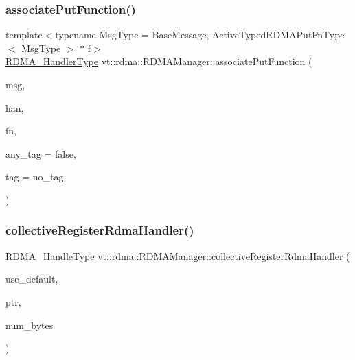 \subsubsection{\texorpdfstring{associate\+Put\+Function()}{associatePutFunction()}}
{\footnotesize\ttfamily template$<$typename Msg\+Type  = Base\+Message, Active\+Typed\+R\+D\+M\+A\+Put\+Fn\+Type$<$ Msg\+Type $>$ $\ast$ f$>$ \\
\hyperlink{namespacevt_a9530efb893c0f3846e8ac5f0507e0f49}{R\+D\+M\+A\+\_\+\+Handler\+Type} vt\+::rdma\+::\+R\+D\+M\+A\+Manager\+::associate\+Put\+Function (\begin{DoxyParamCaption}\item[{Msg\+Type $\ast$}]{msg,  }\item[{\hyperlink{namespacevt_a10442579ec4e7ebef223818e64bcf908}{R\+D\+M\+A\+\_\+\+Handle\+Type} const \&}]{han,  }\item[{\hyperlink{structvt_1_1rdma_1_1_r_d_m_a_manager_ad9746ec3367968e16945ef88c1ac45ce}{R\+D\+M\+A\+\_\+\+Put\+Typed\+Function\+Type}$<$ Msg\+Type $>$ const \&}]{fn,  }\item[{bool const \&}]{any\+\_\+tag = {\ttfamily false},  }\item[{\hyperlink{namespacevt_a84ab281dae04a52a4b243d6bf62d0e52}{Tag\+Type} const \&}]{tag = {\ttfamily no\+\_\+tag} }\end{DoxyParamCaption})\hspace{0.3cm}{\ttfamily [inline]}}

\mbox{\label{structvt_1_1rdma_1_1_r_d_m_a_manager_a526b7c441125a9d5ed9528736be97819}} 
\subsubsection{\texorpdfstring{collective\+Register\+Rdma\+Handler()}{collectiveRegisterRdmaHandler()}}
{\footnotesize\ttfamily \hyperlink{namespacevt_a10442579ec4e7ebef223818e64bcf908}{R\+D\+M\+A\+\_\+\+Handle\+Type} vt\+::rdma\+::\+R\+D\+M\+A\+Manager\+::collective\+Register\+Rdma\+Handler (\begin{DoxyParamCaption}\item[{bool const \&}]{use\+\_\+default,  }\item[{\hyperlink{namespacevt_a9e2c953286c7616f7c218e9951790776}{R\+D\+M\+A\+\_\+\+Ptr\+Type} const \&}]{ptr,  }\item[{\hyperlink{namespacevt_aab8d55968084610ce3b17057981e9300}{Byte\+Type} const \&}]{num\+\_\+bytes }\end{DoxyParamCaption})\hspace{0.3cm}{\ttfamily [inline]}}

